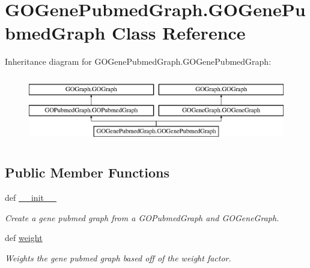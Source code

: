 \hypertarget{class_g_o_gene_pubmed_graph_1_1_g_o_gene_pubmed_graph}{
\section{GOGenePubmedGraph.GOGenePubmedGraph Class Reference}
\label{class_g_o_gene_pubmed_graph_1_1_g_o_gene_pubmed_graph}
}
Inheritance diagram for GOGenePubmedGraph.GOGenePubmedGraph:\begin{figure}[H]
\begin{center}
\leavevmode
\includegraphics[height=2.978723cm]{class_g_o_gene_pubmed_graph_1_1_g_o_gene_pubmed_graph}
\end{center}
\end{figure}
\subsection*{Public Member Functions}
\begin{DoxyCompactItemize}
\item 
def \hyperlink{class_g_o_gene_pubmed_graph_1_1_g_o_gene_pubmed_graph_a903ad3047a2d1b88fffbdeee60b2045e}{\_\-\_\-init\_\-\_\-}
\begin{DoxyCompactList}\small\item\em Create a gene pubmed graph from a GOPubmedGraph and GOGeneGraph. \item\end{DoxyCompactList}\item 
def \hyperlink{class_g_o_gene_pubmed_graph_1_1_g_o_gene_pubmed_graph_a9eb2cec10a76d3b4e8022184c4260add}{weight}
\begin{DoxyCompactList}\small\item\em Weights the gene pubmed graph based off of the weight factor. \item\end{DoxyCompactList}\end{DoxyCompactItemize}


